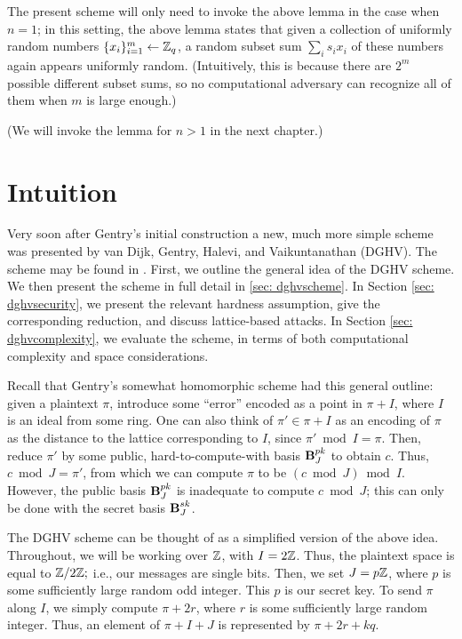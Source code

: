 The present scheme will only need to invoke the above lemma in the case when $n = 1$; in this setting, the above lemma states that given a collection of uniformly random numbers $\{x_i\}_{i = 1}^m \leftarrow \mathbb{Z}_q$, a random subset sum $\sum_i s_i x_i$ of these numbers again appears uniformly random. (Intuitively, this is because there are $2^m$ possible different subset sums, so no computational adversary can recognize all of them when $m$ is large enough.)

(We will invoke the lemma for $n>1$ in the next chapter.)


\section{Intuition}
\label{sec:integers}
Very soon after Gentry's initial construction a new, much more simple scheme was presented by van Dijk, Gentry, Halevi, and Vaikuntanathan (DGHV). The scheme may be found in \cite{dghv}. First, we outline the general idea of the DGHV scheme. We then present the scheme in full detail in \ref{sec: dghvscheme}. In Section \ref{sec: dghvsecurity}, we present the relevant hardness assumption, give the corresponding reduction, and discuss lattice-based attacks. In Section \ref{sec: dghvcomplexity}, we evaluate the scheme, in terms of both computational complexity and space considerations.


Recall that Gentry's somewhat homomorphic scheme had this general outline: given a plaintext $\pi$, introduce some ``error'' encoded as a point in $\pi + I$, where $I$ is an ideal from some ring. One can also think of $\pi' \in \pi + I$ as an encoding of $\pi$ as the distance to the lattice corresponding to $I$, since $\pi' \bmod I = \pi$. Then, reduce $\pi'$ by some public, hard-to-compute-with basis $\textbf{B}_J^{pk}$ to obtain $c$. Thus, $c \bmod J = \pi'$, from which we can compute $\pi$ to be $(c \bmod J) \bmod I$. However, the public basis $\textbf{B}_J^{pk}$ is inadequate to compute $c \bmod J$; this can only be done with the secret basis $\textbf{B}_J^{sk}$.

The DGHV scheme can be thought of as a simplified version of the above idea. Throughout, we will be working over $\mathbb{Z}$, with $I = 2\mathbb{Z}$. Thus, the plaintext space is equal to $\mathbb{Z} / 2\mathbb{Z};$ i.e., our messages are single bits. Then, we set $J = p\mathbb{Z}$, where $p$ is some sufficiently large random odd integer. This $p$ is our secret key. To send $\pi$ along $I$, we simply compute $\pi + 2r$, where $r$ is some sufficiently large random integer. Thus, an element of $\pi + I + J$ is represented by $\pi + 2r + kq$.

